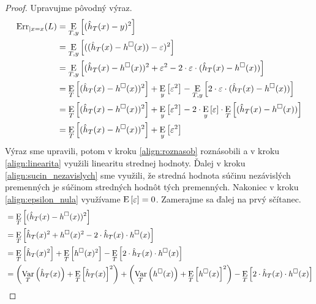 \begin{proof}
  Upravujme pôvodný výraz.
  \begin{align}
    \mathrm{Err}_{|x=x}(L)
      &= \operatorname*{\mathrm{E}}_{T, y} \left[ (\hat{h}_T(x) - y)^2 \right] \\
      &= \operatorname*{\mathrm{E}}_{T, y} \left[ ((\hat{h}_T(x) - h^\square(x)) - \varepsilon)^2 \right] \\
      &= \operatorname*{\mathrm{E}}_{T, y} \left[ (\hat{h}_T(x) - h^\square(x))^2 + \varepsilon^2 - 2 \cdot \varepsilon \cdot (\hat{h}_T(x) - h^\square(x)) \right] \label{align:roznasob} \\
      &= \operatorname*{\mathrm{E}}_T \left[ (\hat{h}_T(x) - h^\square(x))^2 \right] + \operatorname*{\mathrm{E}}_y \left[ \varepsilon^2 \right] - \operatorname*{\mathrm{E}}_{T, y} \left[ 2 \cdot \varepsilon \cdot (\hat{h}_T(x) - h^\square(x)) \right] \label{align:linearita} \\
      &= \operatorname*{\mathrm{E}}_T \left[ (\hat{h}_T(x) - h^\square(x))^2 \right] + \operatorname*{\mathrm{E}}_y \left[ \varepsilon^2 \right] - 2 \cdot \operatorname*{\mathrm{E}}_y \left[ \varepsilon \right] \cdot \operatorname*{\mathrm{E}}_T \left[ (\hat{h}_T(x) - h^\square(x)) \right] \label{align:sucin_nezavislych} \\
      &= \operatorname*{\mathrm{E}}_T \left[ (\hat{h}_T(x) - h^\square(x))^2 \right] + \operatorname*{\mathrm{E}}_y \left[ \varepsilon^2 \right] \label{align:epsilon_nula}
  \end{align}
  Výraz sme upravili, potom v kroku \ref{align:roznasob} roznásobili a v kroku
  \ref{align:linearita} využili linearitu strednej hodnoty.
  Ďalej v kroku \ref{align:sucin_nezavislych} sme využili, že
  stredná hodnota súčinu nezávislých premenných je súčinom stredných
  hodnôt tých premenných. Nakoniec v kroku \ref{align:epsilon_nula}
  využívame $\operatorname*{\mathrm{E}} \left[ \varepsilon \right] = 0$. Zamerajme sa ďalej na prvý sčítanec.
  \begin{align}
    &= \operatorname*{\mathrm{E}}_T \left[ (\hat{h}_T(x) - h^\square(x))^2 \right] \\
    &= \operatorname*{\mathrm{E}}_T \left[ \hat{h}_T(x)^2 + h^\square(x)^2 - 2 \cdot \hat{h}_T(x) \cdot h^\square(x) \right] \label{align:roznasob2} \\
    &= \operatorname*{\mathrm{E}}_T \left[ \hat{h}_T(x)^2 \right] + \operatorname*{\mathrm{E}}_T \left[ h^\square(x)^2 \right] - \operatorname*{\mathrm{E}}_T \left[ 2 \cdot \hat{h}_T(x) \cdot h^\square(x) \right] \label{align:linearita2} \\
    &= \left( \operatorname*{\mathrm{Var}}_T \left( \hat{h}_T(x) \right) + \operatorname*{\mathrm{E}}_T \left[ \hat{h}_T(x) \right]^2 \right) + \left( \operatorname*{\mathrm{Var}}_T \left( h^\square(x) \right) + \operatorname*{\mathrm{E}}_T \left[ h^\square(x) \right]^2 \right) - \operatorname*{\mathrm{E}}_T \left[ 2 \cdot \hat{h}_T(x) \cdot h^\square(x) \right] \label{align:var_alt} \\
  \end{align}

\end{proof}
